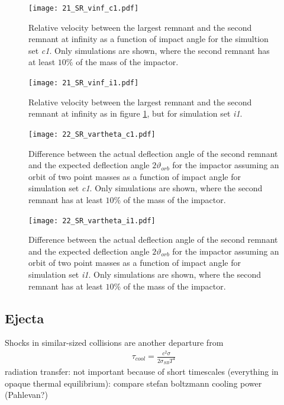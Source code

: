 {\begin{landscape}

\begin{figure}[htbp]
\begin{center}
\texttt{[image: 21\_SR\_vinf\_c1.pdf]}
\caption{Relative velocity between the largest remnant and the second remnant at infinity as a function of impact angle for the simultion set \emph{c1}. Only simulations are shown, where the second remnant has at least $10\%$ of the mass of the impactor.}
\label{ch03_fig21a}
\end{center}
\end{figure}

\begin{figure}[htbp]
\begin{center}
\texttt{[image: 21\_SR\_vinf\_i1.pdf]}
\caption{Relative velocity between the largest remnant and the second remnant at infinity as in figure \ref{ch03_fig21a}, but for simulation set \emph{i1}.}
\label{ch03_fig21b}
\end{center}
\end{figure}

\begin{figure}[htbp]
\begin{center}
\texttt{[image: 22\_SR\_vartheta\_c1.pdf]}
\caption{Difference between the actual deflection angle of the second remnant and the expected deflection angle $2 \vartheta_{orb}$ for the impactor assuming an orbit of two point masses as a function of impact angle for simulation set \emph{c1}. Only simulations are shown, where the second remnant has at least $10\%$ of the mass of the impactor.}
\label{ch03_fig22a}
\end{center}
\end{figure}

\begin{figure}[htbp]
\begin{center}
\texttt{[image: 22\_SR\_vartheta\_i1.pdf]}
\caption{Difference between the actual deflection angle of the second remnant and the expected deflection angle $2 \vartheta_{orb}$ for the impactor assuming an orbit of two point masses as a function of impact angle for simulation set \emph{i1}. Only simulations are shown, where the second remnant has at least $10\%$ of the mass of the impactor.}
\label{ch03_fig22b}
\end{center}
\end{figure}
\end{landscape}


\subsection{Ejecta}
Shocks in similar-sized collisions are another departure from 
\begin{align}
\tau_{cool} = \frac{c^2 \sigma}{ 2 \sigma_{SB} T^4}
\end{align}
\cite{Thompson:1988p3451}
radiation transfer: not important because of short timescales (everything in opaque thermal equilibrium): compare stefan boltzmann cooling power (Pahlevan?)


}
